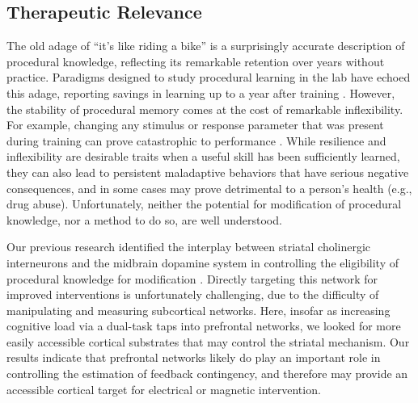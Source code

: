 \documentclass[apacite,draftfirst,jou]{apa6}
\begin{document}

\subsection*{Therapeutic Relevance}
The old adage of ``it's like riding a bike'' is a surprisingly accurate
description of procedural knowledge, reflecting its remarkable retention over
years without practice. Paradigms designed to study procedural learning in the
lab have echoed this adage, reporting savings in learning up to a year after
training \cite{Romano2010, turner_long-term_2012}. However, the stability of
procedural memory comes at the cost of remarkable inflexibility. For example,
changing any stimulus or response parameter that was present during training can
prove catastrophic to performance \cite{Rozanov_2010, Dienes_1997}. While
resilience and inflexibility are desirable traits when a useful skill has been
sufficiently learned, they can also lead to persistent maladaptive behaviors
that have serious negative consequences, and in some cases may prove detrimental
to a person's health (e.g., drug abuse). Unfortunately, neither the potential
for modification of procedural knowledge, nor a method to do so, are well
understood.

Our previous research identified the interplay between striatal cholinergic
interneurons and the midbrain dopamine system in controlling the eligibility of
procedural knowledge for modification \cite{AshbyCrossley2011,
crossley_erasing_2013}. Directly targeting this network for improved
interventions is unfortunately challenging, due to the difficulty of
manipulating and measuring subcortical networks. Here, insofar as increasing
cognitive load via a dual-task taps into prefrontal networks, we looked for more
easily accessible cortical substrates that may control the striatal mechanism.
Our results indicate that prefrontal networks likely do play an important role
in controlling the estimation of feedback contingency, and therefore may provide
an accessible cortical target for electrical or magnetic intervention.


\end{document}
